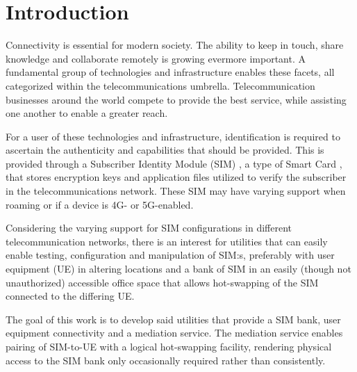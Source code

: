 \chapter{Introduction}

Connectivity is essential for modern society. The ability to keep in
touch, share knowledge and collaborate remotely is growing evermore
important. A fundamental group of technologies and infrastructure
enables these facets, all categorized within the telecommunications
umbrella. Telecommunication businesses around the world compete to
provide the best service, while assisting one another to enable a
greater reach.

For a user of these technologies and infrastructure, identification
is required to ascertain the authenticity and capabilities that
should be provided. This is provided through a Subscriber Identity
Module (SIM) \cite{sim}, a type of Smart Card \cite{smartcard}, that
stores encryption keys and application files utilized to verify the
subscriber in the telecommunications network. These SIM may have
varying support when roaming or if a device is 4G- or 5G-enabled.

Considering the varying support for SIM configurations in different
telecommunication networks, there is an interest for utilities that
can easily enable testing, configuration and manipulation of SIM:s,
preferably with user equipment (UE) in altering locations and a bank
of SIM in an easily (though not unauthorized) accessible office space
that allows hot-swapping of the SIM connected to the differing UE.

The goal of this work is to develop said utilities that provide a
SIM bank, user equipment connectivity and a mediation service. The
mediation service enables pairing of SIM-to-UE with a logical
hot-swapping facility, rendering physical access to the SIM bank
only occasionally required rather than consistently.
